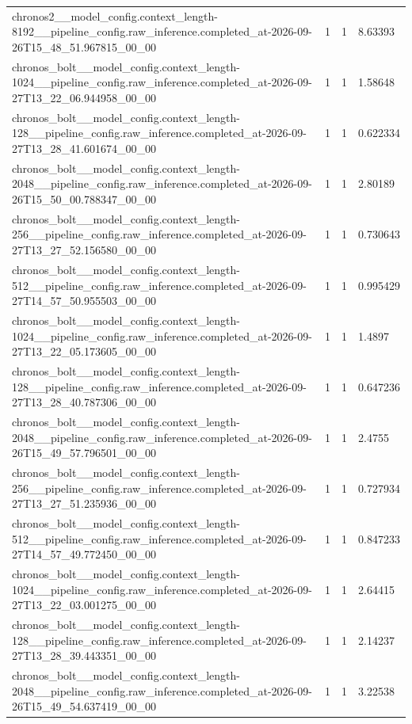 \begin{tabular}{llll}
chronos2\_\_model\_config.context\_length-8192\_\_pipeline\_config.raw\_inference.completed\_at-2026-09-26T15\_48\_51.967815\_00\_00 & 1 & 1 & 8.63393 \\
chronos\_bolt\_\_model\_config.context\_length-1024\_\_pipeline\_config.raw\_inference.completed\_at-2026-09-27T13\_22\_06.944958\_00\_00 & 1 & 1 & 1.58648 \\
chronos\_bolt\_\_model\_config.context\_length-128\_\_pipeline\_config.raw\_inference.completed\_at-2026-09-27T13\_28\_41.601674\_00\_00 & 1 & 1 & 0.622334 \\
chronos\_bolt\_\_model\_config.context\_length-2048\_\_pipeline\_config.raw\_inference.completed\_at-2026-09-26T15\_50\_00.788347\_00\_00 & 1 & 1 & 2.80189 \\
chronos\_bolt\_\_model\_config.context\_length-256\_\_pipeline\_config.raw\_inference.completed\_at-2026-09-27T13\_27\_52.156580\_00\_00 & 1 & 1 & 0.730643 \\
chronos\_bolt\_\_model\_config.context\_length-512\_\_pipeline\_config.raw\_inference.completed\_at-2026-09-27T14\_57\_50.955503\_00\_00 & 1 & 1 & 0.995429 \\
chronos\_bolt\_\_model\_config.context\_length-1024\_\_pipeline\_config.raw\_inference.completed\_at-2026-09-27T13\_22\_05.173605\_00\_00 & 1 & 1 & 1.4897 \\
chronos\_bolt\_\_model\_config.context\_length-128\_\_pipeline\_config.raw\_inference.completed\_at-2026-09-27T13\_28\_40.787306\_00\_00 & 1 & 1 & 0.647236 \\
chronos\_bolt\_\_model\_config.context\_length-2048\_\_pipeline\_config.raw\_inference.completed\_at-2026-09-26T15\_49\_57.796501\_00\_00 & 1 & 1 & 2.4755 \\
chronos\_bolt\_\_model\_config.context\_length-256\_\_pipeline\_config.raw\_inference.completed\_at-2026-09-27T13\_27\_51.235936\_00\_00 & 1 & 1 & 0.727934 \\
chronos\_bolt\_\_model\_config.context\_length-512\_\_pipeline\_config.raw\_inference.completed\_at-2026-09-27T14\_57\_49.772450\_00\_00 & 1 & 1 & 0.847233 \\
chronos\_bolt\_\_model\_config.context\_length-1024\_\_pipeline\_config.raw\_inference.completed\_at-2026-09-27T13\_22\_03.001275\_00\_00 & 1 & 1 & 2.64415 \\
chronos\_bolt\_\_model\_config.context\_length-128\_\_pipeline\_config.raw\_inference.completed\_at-2026-09-27T13\_28\_39.443351\_00\_00 & 1 & 1 & 2.14237 \\
chronos\_bolt\_\_model\_config.context\_length-2048\_\_pipeline\_config.raw\_inference.completed\_at-2026-09-26T15\_49\_54.637419\_00\_00 & 1 & 1 & 3.22538 \\

\end{tabular}
